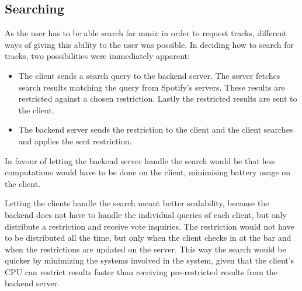 \subsection{Searching}
As the user has to be able search for music in order to request tracks, different ways of giving this ability to the user was possible. In deciding how to search for tracks, two possibilities were immediately apparent:

\begin{itemize}
  \item The client sends a search query to the backend server. The
    server fetches search results matching the query from Spotify's servers. These results are restricted against a chosen restriction. Lastly the restricted results are sent to the client.
  \item The backend server sends the restriction to the client and the client searches and applies the sent restriction.
\end{itemize}

In favour of letting the backend server handle the search would be
that less computations would have to be done on the client, minimising
battery usage on the client.

Letting the clients handle the search meant better scalability,
because the backend does not have to handle the individual queries of
each client, but only distribute a restriction and receive vote
inquiries. The restriction would not have to be distributed all the
time, but only  when the client checks in at the bar and when the
restrictions are updated on the server. This way the search would be
quicker by minimizing the systems involved in the system, given that
the client's CPU can restrict results faster than receiving
pre-restricted results from the backend server.
